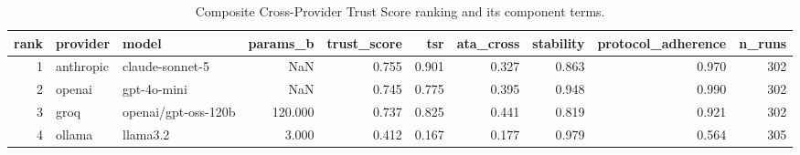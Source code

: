 \begin{table}
\caption{Composite Cross-Provider Trust Score ranking and its component terms.}
\label{tab:table4_trust_score_ranking}
\begin{tabular}{rllrrrrrrr}
\toprule
rank & provider & model & params_b & trust_score & tsr & ata_cross & stability & protocol_adherence & n_runs \\
\midrule
1 & anthropic & claude-sonnet-5 & NaN & 0.755 & 0.901 & 0.327 & 0.863 & 0.970 & 302 \\
2 & openai & gpt-4o-mini & NaN & 0.745 & 0.775 & 0.395 & 0.948 & 0.990 & 302 \\
3 & groq & openai/gpt-oss-120b & 120.000 & 0.737 & 0.825 & 0.441 & 0.819 & 0.921 & 302 \\
4 & ollama & llama3.2 & 3.000 & 0.412 & 0.167 & 0.177 & 0.979 & 0.564 & 305 \\
\bottomrule
\end{tabular}
\end{table}
